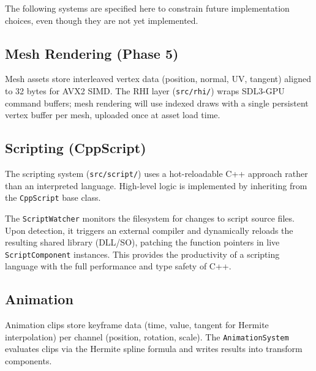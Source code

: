 The following systems are specified here to constrain future
implementation choices, even though they are not yet implemented.

\subsection{Mesh Rendering (Phase 5)}

Mesh assets store interleaved vertex data (position, normal, UV, tangent)
aligned to 32 bytes for AVX2 SIMD. The RHI layer (\texttt{src/rhi/})
wraps SDL3-GPU command buffers; mesh rendering will use indexed draws
with a single persistent vertex buffer per mesh, uploaded once at asset
load time.

\subsection{Scripting (CppScript)}

The scripting system (\texttt{src/script/}) uses a hot-reloadable C++ approach 
rather than an interpreted language. High-level logic is implemented by 
inheriting from the \texttt{CppScript} base class.

The \texttt{ScriptWatcher} monitors the filesystem for changes to script 
source files. Upon detection, it triggers an external compiler and 
dynamically reloads the resulting shared library (DLL/SO), patching the 
function pointers in live \texttt{ScriptComponent} instances. This provides 
the productivity of a scripting language with the full performance and type 
safety of C++.

\subsection{Animation}

Animation clips store keyframe data (time, value, tangent for Hermite
interpolation) per channel (position, rotation, scale). The
\texttt{AnimationSystem} evaluates clips via the Hermite spline formula
and writes results into transform components.
